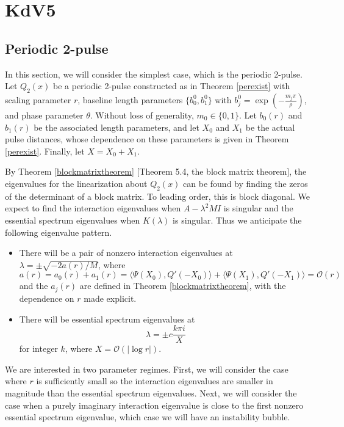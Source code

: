 \documentclass[thesis.tex]{subfiles}
\begin{document}
\chapter{KdV5}

\section{Periodic 2-pulse}

In this section, we will consider the simplest case, which is the periodic 2-pulse. Let $Q_2(x)$ be a periodic 2-pulse constructed as in Theorem \ref{perexist} with scaling parameter $r$, baseline length parameters $\{b_0^0, b_1^0 \}$ with $b_j^0 = \exp\left(-\frac{m_j \pi}{\rho}\right)$, and phase parameter $\theta$. Without loss of generality, $m_0 \in \{0, 1\}$. Let $b_0(r)$ and $b_1(r)$ be the associated length parameters, and let $X_0$ and $X_1$ be the actual pulse distances, whose dependence on these parameters is given in Theorem \ref{perexist}. Finally, let $X = X_0 + X_1$.  

By Theorem \ref{blockmatrixtheorem} [Theorem 5.4, the block matrix theorem], the eigenvalues for the linearization about $Q_2(x)$ can be found by finding the zeros of the determinant of a block matrix. To leading order, this is block diagonal. We expect to find the interaction eigenvalues when $A - \lambda^2 M I$ is singular and the essential spectrum eigenvalues when $K(\lambda)$ is singular. Thus we anticipate the following eigenvalue pattern.
\begin{itemize}
\item There will be a pair of nonzero interaction eigenvalues at $\lambda = \pm \sqrt{-2a(r)/M}$, where 
\[
a(r) = a_0(r) + a_1(r) = \langle \Psi(X_0), Q'(-X_0) \rangle + \langle \Psi(X_1), Q'(-X_1) \rangle = \mathcal{O}(r)
\]
and the $a_j(r)$ are defined in Theorem \ref{blockmatrixtheorem}, with the dependence on $r$ made explicit.
\item There will be essential spectrum eigenvalues at
\[
\lambda = \pm c \frac{k \pi i}{X}
\]
for integer $k$, where $X = \mathcal{O}(|\log r|)$.
\end{itemize}

We are interested in two parameter regimes. First, we will consider the case where $r$ is sufficiently small so the interaction eigenvalues are smaller in magnitude than the essential spectrum eigenvalues. Next, we will consider the case when a purely imaginary interaction eigenvalue is close to the first nonzero essential spectrum eigenvalue, which case we will have an instability bubble.
\end{document}

